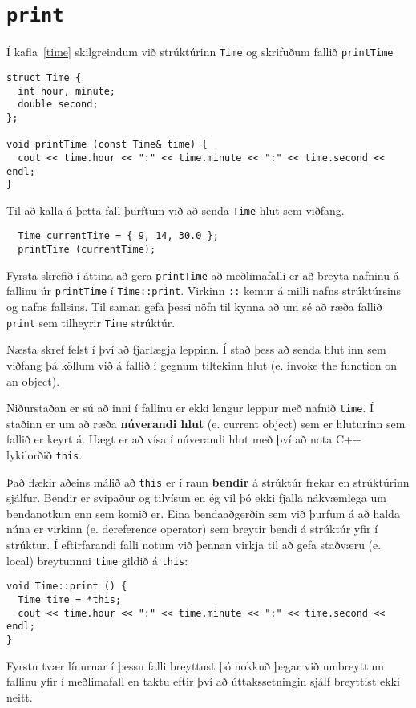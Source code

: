 \section{{\tt print}}

Í kafla~\ref{time} skilgreindum við strúktúrinn {\tt Time}
og skrifuðum fallið {\tt printTime}

\begin{verbatim}
struct Time {
  int hour, minute;
  double second;
};

void printTime (const Time& time) {
  cout << time.hour << ":" << time.minute << ":" << time.second << endl;
}
\end{verbatim}
%
Til að kalla á þetta fall þurftum við að senda {\tt Time} hlut sem viðfang. 

\begin{verbatim}
  Time currentTime = { 9, 14, 30.0 };
  printTime (currentTime);
\end{verbatim}
%
Fyrsta skrefið í áttina að gera {\tt printTime} að meðlimafalli er að breyta nafninu á fallinu úr {\tt printTime} í {\tt Time::print}.
Virkinn {\tt ::} kemur á milli nafns strúktúrsins og nafns fallsins.
Til saman gefa þessi nöfn til kynna að um sé að ræða fallið {\tt print} sem tilheyrir {\tt Time} strúktúr.

Næsta skref felst í því að fjarlægja leppinn.
Í stað þess að senda hlut inn sem viðfang þá köllum við á fallið í gegnum tiltekinn hlut (e. invoke the function on an object).

Niðurstaðan er sú að inni í fallinu er ekki lengur leppur með nafnið {\tt time}.
Í staðinn er um að ræða {\bf núverandi hlut} (e. current object) sem er hluturinn sem fallið er keyrt á.
Hægt er að vísa í núverandi hlut með því að nota C++ lykilorðið {\tt this}.


Það flækir aðeins málið að {\tt this} er í raun {\bf bendir} á strúktúr frekar en strúktúrinn sjálfur.
Bendir er svipaður og tilvísun en ég vil þó ekki fjalla nákvæmlega um bendanotkun enn sem komið er.
Eina bendaaðgerðin sem við þurfum á að halda núna er {\tt *} virkinn (e. dereference operator) sem breytir bendi á strúktúr yfir í strúktur.
Í eftirfarandi falli notum við þennan virkja til að gefa staðværu (e. local) breytunnni {\tt time} gildið á {\tt this}:

\begin{verbatim}
void Time::print () {
  Time time = *this;
  cout << time.hour << ":" << time.minute << ":" << time.second << endl;
}
\end{verbatim}
%
Fyrstu tvær línurnar í þessu falli breyttust þó nokkuð þegar við umbreyttum fallinu yfir í meðlimafall 
en taktu eftir því að úttakssetningin sjálf breyttist ekki neitt.

